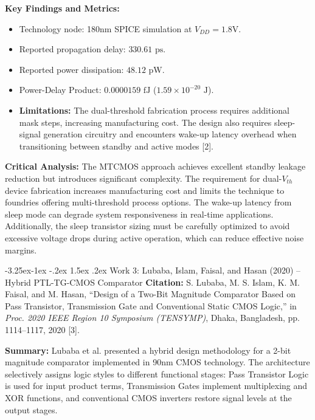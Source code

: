 \documentclass[12pt,a4paper,oneside]{report}
\makeatletter
\renewcommand\subsection{\@startsection{subsection}{2}{\z@}%
                                     {-3.25ex\@plus -1ex \@minus -.2ex}%
                                     {1.5ex \@plus .2ex}%
                                     {\normalfont\normalsize\bfseries\itshape}}
\makeatother
\begin{document}
\noindent\textbf{Key Findings and Metrics:}
\begin{itemize}
\item Technology node: 180nm SPICE simulation at $V_{DD} = 1.8\text{V}$.
\item Reported propagation delay: $330.61\text{ ps}$.
\item Reported power dissipation: $48.12\text{ pW}$.
\item Power-Delay Product: $0.0000159\text{ fJ}$ ($1.59\times 10^{-20}\text{ J}$).
\item \textbf{Limitations:} The dual-threshold fabrication process requires additional mask steps, increasing manufacturing cost. The design also requires sleep-signal generation circuitry and encounters wake-up latency overhead when transitioning between standby and active modes [2].
\end{itemize}

\noindent\textbf{Critical Analysis:} The MTCMOS approach achieves excellent standby leakage reduction but introduces significant complexity. The requirement for dual-$V_{th}$ device fabrication increases manufacturing cost and limits the technique to foundries offering multi-threshold process options. The wake-up latency from sleep mode can degrade system responsiveness in real-time applications. Additionally, the sleep transistor sizing must be carefully optimized to avoid excessive voltage drops during active operation, which can reduce effective noise margins.

\subsection{Work 3: Lubaba, Islam, Faisal, and Hasan (2020) -- Hybrid PTL-TG-CMOS Comparator}
\textbf{Citation:} S. Lubaba, M. S. Islam, K. M. Faisal, and M. Hasan, ``Design of a Two-Bit Magnitude Comparator Based on Pass Transistor, Transmission Gate and Conventional Static CMOS Logic,'' in \textit{Proc. 2020 IEEE Region 10 Symposium (TENSYMP)}, Dhaka, Bangladesh, pp. 1114--1117, 2020 [3].

\noindent\textbf{Summary:} Lubaba et al. presented a hybrid design methodology for a 2-bit magnitude comparator implemented in 90nm CMOS technology. The architecture selectively assigns logic styles to different functional stages: Pass Transistor Logic is used for input product terms, Transmission Gates implement multiplexing and XOR functions, and conventional CMOS inverters restore signal levels at the output stages.
\end{document}

